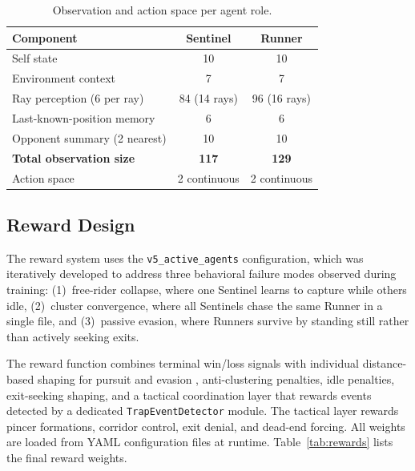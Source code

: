 \documentclass[journal]{IEEEtran}
\begin{document}
\begin{table}[t]
\centering
\caption{Observation and action space per agent role.}
\label{tab:state_action}
\begin{tabular}{lcc}
\toprule
Component & Sentinel & Runner \\
\midrule
Self state & 10 & 10 \\
Environment context & 7 & 7 \\
Ray perception (6 per ray) & 84 (14 rays) & 96 (16 rays) \\
Last-known-position memory & 6 & 6 \\
Opponent summary (2 nearest) & 10 & 10 \\
\midrule
\textbf{Total observation size} & \textbf{117} & \textbf{129} \\
\midrule
Action space & 2 continuous & 2 continuous \\
\bottomrule
\end{tabular}
\end{table}

\subsection{Reward Design}

The reward system uses the \texttt{v5\_active\_agents} configuration, which was iteratively developed to address three behavioral failure modes observed during training: (1)~free-rider collapse, where one Sentinel learns to capture while others idle, (2)~cluster convergence, where all Sentinels chase the same Runner in a single file, and (3)~passive evasion, where Runners survive by standing still rather than actively seeking exits.

The reward function combines terminal win/loss signals with individual distance-based shaping for pursuit and evasion \cite{sheikh2020combined}, anti-clustering penalties, idle penalties, exit-seeking shaping, and a tactical coordination layer that rewards events detected by a dedicated \texttt{TrapEventDetector} module. The tactical layer rewards pincer formations, corridor control, exit denial, and dead-end forcing. All weights are loaded from YAML configuration files at runtime. Table~\ref{tab:rewards} lists the final reward weights.
\end{document}
